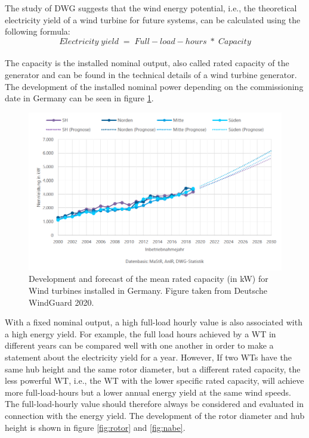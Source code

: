 \documentclass[a4paper,11pt]{article}
\begin{document}
The study of DWG suggests that the wind energy potential, i.e., the theoretical electricity yield of a wind turbine for future systems, can be calculated using the following formula:
\[
Electricity\;yield\; =\; Full-load-hours\; *\; Capacity
\]\\
The capacity is the installed nominal output, also called rated capacity of the generator and can be found in the technical details of a wind turbine generator. The development of the installed nominal power depending on the commissioning date in Germany can be seen in figure \ref{fig:capacity}.
\begin{figure}[H]

{\centering \includegraphics[width=1\linewidth]{figures/DWG/DWG_Nennleistung} 

}

\caption{Development and forecast of the mean rated capacity (in kW) for Wind turbines installed in Germany. Figure taken from Deutsche WindGuard 2020.}\label{fig:capacity}
\end{figure}
With a fixed nominal output, a high full-load hourly value is also associated with a high energy yield. For example, the full load hours achieved by a WT in different years can be compared well with one another in order to make a statement about the electricity yield for a year. However, If two WTs have the same hub height and the same rotor diameter, but a different rated capacity, the less powerful WT, i.e., the WT with the lower specific rated capacity, will achieve more full-load-hours but a lower annual energy yield at the same wind speeds. The full-load-hourly value should therefore always be considered and evaluated in connection with the energy yield. The development of the rotor diameter and hub height is shown in figure \ref{fig:rotor} and \ref{fig:nabe}.
\end{document}

